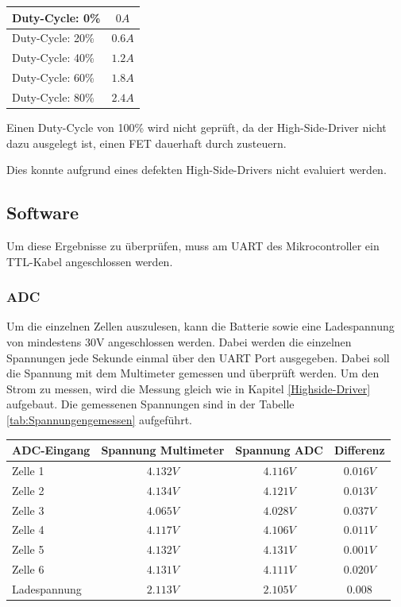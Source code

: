 \begin{center}
	\begin{tabular}{l|c}
		\hline 
		Duty-Cycle: 0\% & $0A$ \\ \hline
		Duty-Cycle: 20\% & $0.6A$ \\ \hline
		Duty-Cycle: 40\% & $1.2A$ \\ \hline
		Duty-Cycle: 60\% & $1.8A$ \\ \hline
		Duty-Cycle: 80\% & $2.4A$ \\ \hline
	\end{tabular} 
	\label{tab:LadestromHighsideDriver}
\end{center}

Einen Duty-Cycle von 100\% wird nicht geprüft, da der High-Side-Driver nicht dazu ausgelegt ist, einen FET dauerhaft durch zusteuern.

Dies konnte aufgrund eines defekten High-Side-Drivers nicht evaluiert werden. 

\subsection{Software}
Um diese Ergebnisse zu überprüfen, muss am UART des Mikrocontroller ein TTL-Kabel angeschlossen werden.

\subsubsection*{ADC}
Um die einzelnen Zellen auszulesen, kann die Batterie sowie eine Ladespannung von mindestens 30V angeschlossen werden. Dabei werden die einzelnen Spannungen jede Sekunde einmal über den UART Port ausgegeben. Dabei soll die Spannung mit dem Multimeter gemessen und überprüft werden. Um den Strom zu messen, wird die Messung gleich wie in Kapitel \ref{Highside-Driver} aufgebaut. Die gemessenen Spannungen sind in der Tabelle \ref{tab:Spannungengemessen} aufgeführt.

\begin{center}
	\begin{tabular}{l|c|c|c}
		ADC-Eingang & Spannung Multimeter & Spannung ADC & Differenz \\ \hline
		Zelle 1 & $4.132V$ & $4.116V$ & $0.016V$ \\ \hline
		Zelle 2 & $4.134V$ & $4.121V$ & $0.013V$ \\ \hline
		Zelle 3 & $4.065V$ & $4.028V$ & $0.037V$ \\ \hline
		Zelle 4 & $4.117V$ & $4.106V$ & $0.011V$ \\ \hline
		Zelle 5 & $4.132V$ & $4.131V$ & $0.001V$ \\ \hline
		Zelle 6 & $4.131V$ & $4.111V$ & $0.020V$ \\ \hline
		Ladespannung & $2.113V$ & $2.105V$ & $0.008$ \\ \hline
	\end{tabular} 
	\label{tab:Spannungengemessen}
\end{center}

